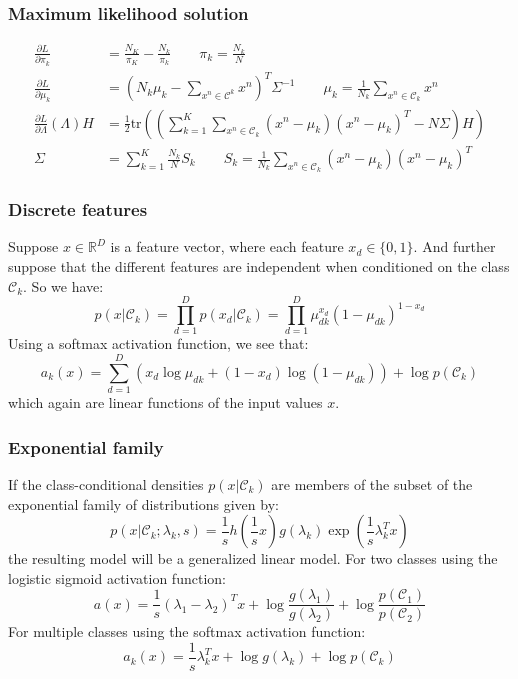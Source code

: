 \documentclass{beamer}
\begin{document}
\begin{frame}
    \frametitle{Maximum likelihood solution}
    \begin{align*}
        \frac{\partial{}L}{\partial\pi_{k}}&=\frac{N_{K}}{\pi_{K}}-\frac{N_{k}}{\pi_{k}}\qquad\pi_{k}=\frac{N_{k}}{N} \\
        \frac{\partial{}L}{\partial\mu_{k}}&=(N_{k}\mu_{k}-\sum_{x^{n}\in\mathcal{C}^{k}}x^{n})^{T}\Sigma^{-1}\qquad\mu_{k}=\frac{1}{N_{k}}\sum_{x^{n}\in\mathcal{C}_{k}}x^{n} \\
        \frac{\partial{}L}{\partial\Lambda}(\Lambda)H&=\frac{1}{2}\mathrm{tr}((\sum_{k=1}^{K}\sum_{x^{n}\in\mathcal{C}_{k}}(x^{n}-\mu_{k})(x^{n}-\mu_{k})^{T}-N\Sigma)H) \\
        \Sigma&=\sum_{k=1}^{K}\frac{N_{k}}{N}S_{k}\qquad{}S_{k}=\frac{1}{N_{k}}\sum_{x^{n}\in\mathcal{C}_{k}}(x^{n}-\mu_{k})(x^{n}-\mu_{k})^{T}
    \end{align*}
\end{frame}

\begin{frame}
    \frametitle{Discrete features}
    Suppose $x\in\mathbb{R}^{D}$ is a feature vector, where each feature $x_{d}\in\{0,1\}$. And further suppose that the different features are independent when conditioned on the class $\mathcal{C}_{k}$. So we have:
    \begin{equation*}
        p(x|\mathcal{C}_{k})=\prod_{d=1}^{D}p(x_{d}|\mathcal{C}_{k})=\prod_{d=1}^{D}\mu_{dk}^{x_{d}}(1-\mu_{dk})^{1-x_{d}}
    \end{equation*}
    Using a softmax activation function, we see that:
    \begin{equation*}
        a_{k}(x)=\sum_{d=1}^{D}(x_{d}\log\mu_{dk}+(1-x_{d})\log(1-\mu_{dk}))+\log{}p(\mathcal{C}_{k})
    \end{equation*}
    which again are linear functions of the input values $x$.
\end{frame}

\begin{frame}
    \frametitle{Exponential family}
    If the class-conditional densities $p(x|\mathcal{C}_{k})$ are members of the subset of the exponential family of distributions given by:
    \begin{equation*}
        p(x|\mathcal{C}_{k};\lambda_{k},s)=\frac{1}{s}h(\frac{1}{s}x)g(\lambda_{k})\exp(\frac{1}{s}\lambda_{k}^{T}x)
    \end{equation*}
    the resulting model will be a generalized linear model. For two classes using the logistic sigmoid activation function:
    \begin{equation*}
        a(x)=\frac{1}{s}(\lambda_{1}-\lambda_{2})^{T}x+\log\frac{g(\lambda_{1})}{g(\lambda_{2})}+\log\frac{p(\mathcal{C}_{1})}{p(\mathcal{C}_{2})}
    \end{equation*}
    For multiple classes using the softmax activation function:
    \begin{equation*}
        a_{k}(x)=\frac{1}{s}\lambda_{k}^{T}x+\log{}g(\lambda_{k})+\log{}p(\mathcal{C}_{k})
    \end{equation*}
\end{frame}
\end{document}
